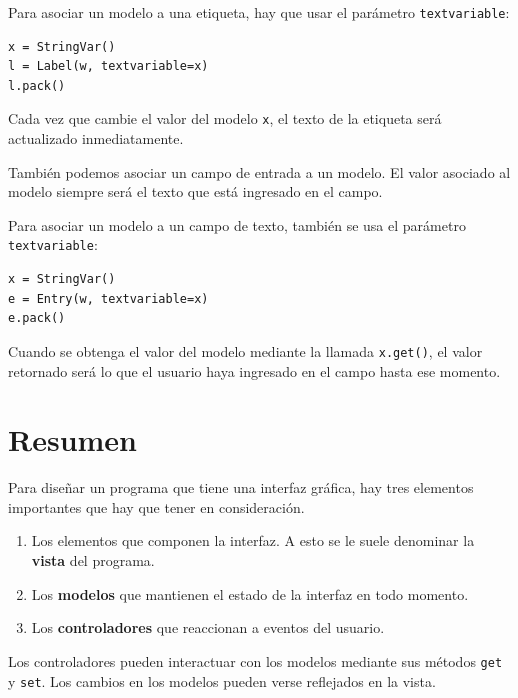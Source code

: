 Para asociar un modelo a una etiqueta, hay que usar el parámetro
\lstinline!textvariable!:

\begin{lstlisting}
x = StringVar()
l = Label(w, textvariable=x)
l.pack()
\end{lstlisting}

Cada vez que cambie el valor del modelo \lstinline!x!, el texto de la
etiqueta será actualizado inmediatamente.

También podemos asociar un campo de entrada a un modelo. El valor
asociado al modelo siempre será el texto que está ingresado en el campo.

Para asociar un modelo a un campo de texto, también se usa el parámetro
\lstinline!textvariable!:

\begin{lstlisting}
x = StringVar()
e = Entry(w, textvariable=x)
e.pack()
\end{lstlisting}

Cuando se obtenga el valor del modelo mediante la llamada
\lstinline!x.get()!, el valor retornado será lo que el usuario haya
ingresado en el campo hasta ese momento.

\section{Resumen}

Para diseñar un programa que tiene una interfaz gráfica, hay tres
elementos importantes que hay que tener en consideración.

\begin{enumerate}
\item
  Los elementos que componen la interfaz. A esto se le suele denominar
  la \textbf{vista} del programa.
\item
  Los \textbf{modelos} que mantienen el estado de la interfaz en todo
  momento.
\item
  Los \textbf{controladores} que reaccionan a eventos del usuario.
\end{enumerate}

Los controladores pueden interactuar con los modelos mediante sus
métodos \lstinline!get! y \lstinline!set!. Los cambios en los modelos
pueden verse reflejados en la vista.
